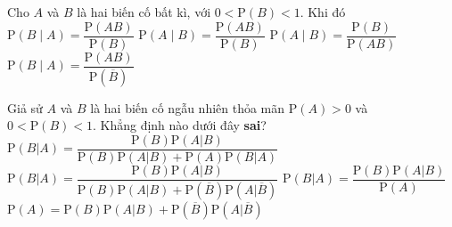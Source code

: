 

\begin{ex}%
	Cho  $A$ và $B$ là hai biến cố bất kì, với $0<\mathrm{P}(B)<1$. Khi đó
	\choice 
		{$\mathrm{P}(B \mid A)=\dfrac{\mathrm{P}(A  B)}{\mathrm{P}(B)}$}
		 {\True $\mathrm{P}(A \mid B)=\dfrac{\mathrm{P}(A B)}{\mathrm{P}(B)}$}
		{$\mathrm{P}(A \mid B)=\dfrac{\mathrm{P}(B)}{\mathrm{P}(A  B)}$}
		{$\mathrm{P}(B  \mid A)=\dfrac{\mathrm{P}(A B)}{\mathrm{P}(\overline{B})}$}
\end{ex}

\begin{ex}%
	Giả sử $A$ và $B$ là hai biến cố ngẫu nhiên thỏa mãn $\mathrm{P}\left(A\right)>0$ và $0<\mathrm{P}\left(B\right)<1$. Khẳng định nào  dưới đây \textbf{sai}?
	\choice 
		 {\True $\mathrm{P}\left(B|A\right)=\dfrac{\mathrm{P}\left(B\right)\mathrm{P}\left(A|B\right)}{\mathrm{P}\left(B\right)\mathrm{P}\left(A|B\right)+\mathrm{P}\left(A\right)\mathrm{P}\left(B|A\right)}$}
		 {$\mathrm{P}\left(B|A\right)=\dfrac{\mathrm{P}\left(B\right)\mathrm{P}\left(A|B\right)}{\mathrm{P}\left(B\right)\mathrm{P}\left(A|B\right)+\mathrm{P}\left(\overline{B}\right)\mathrm{P}\left(A|\overline{B}\right)}$}
		{$\mathrm{P}\left(B|A\right)=\dfrac{\mathrm{P}\left(B\right)\mathrm{P}\left(A|B\right)}{\mathrm{P}\left(A\right)}$} 
		{$\mathrm{P}\left(A\right)=\mathrm{P}\left(B\right)\mathrm{P}\left(A|B\right)+\mathrm{P}\left(\overline{B}\right)\mathrm{P}\left(A|\overline{B}\right)$} 
\end{ex}

